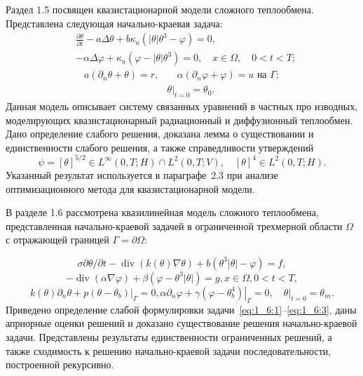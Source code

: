 Раздел 1.5 посвящен квазистационарной модели сложного теплообмена.
Представлена следующая начально-краевая задача:
\begin{equation}
    \label{eq:1_5:1}
    \begin{split}
        & \frac{\partial \theta}{\partial t} - a \Delta \theta
        + b \kappa_{a} \left(|\theta| \theta^{3}-\varphi\right) = 0,\\
        & - \alpha \Delta \varphi
        + \kappa_{a} \left(\varphi-|\theta| \theta^{3}\right) = 0,
        \quad x \in \Omega, \quad 0 < t < T;
    \end{split}
\end{equation}
\begin{align}
    a \left(\partial_{n} \theta+\theta\right)=r,
    & \quad \alpha\left(\partial_{n} \varphi
    + \varphi\right) = u \text { на } \Gamma;  \label{eq:1_5:2}\\
    & \left.\theta\right|_{t=0} = \theta_{0}. \label{eq:1_5:3}
\end{align}
Данная модель описывает систему связанных уравнений в частных про
изводных, моделирующих квазистационарный радиационный и диффузионный
теплообмен.
Дано определение слабого решения, доказана лемма о существовании и единственности
слабого решения, а также справедливости утверждений
\[
    \psi=[\theta]^{5 / 2} \in L^{\infty}(0, T ; H) \cap L^{2}(0, T ; V),
    \quad[\theta]^{4} \in L^{2}(0, T ; H).
\]
Указанный результат используется в параграфе~2.3 при анализе
оптимизационного метода для квазистационарной модели.

В разделе 1.6 рассмотрена квазилинейная модель сложного теплообмена,
представленная начально-краевой задачей в ограниченной трехмерной
области $\Omega$ с отражающей границей $\Gamma=\partial \Omega$:

\begin{equation}
    \label{eq:1_6:1}
    \sigma \partial \theta / \partial t
    -\operatorname{div}(k(\theta) \nabla \theta)
    +b\left(\theta^{3}|\theta|-\varphi\right)=f,
\end{equation}
\begin{equation}
    \label{eq:1_6:2}
    -\operatorname{div}(\alpha \nabla \varphi)
    +\beta\left(\varphi-\theta^{3}|\theta|\right)=g, x \in \Omega, 0<t<T,
\end{equation}
\begin{equation}
    \label{eq:1_6:3}
    k(\theta) \partial_{n} \theta+\left.p\left(\theta-\theta_{b}\right)\right|_{\Gamma}=0,
    \alpha \partial_{n} \varphi
    +\left.\gamma\left(\varphi-\theta_{b}^{4}\right)\right|_{\Gamma}=0,
    \left.\quad \theta\right|_{t=0}=\theta_{in}.
\end{equation}
Приведено определение слабой формулировки задачи~\eqref{eq:1_6:1}--\eqref{eq:1_6:3},
даны априорные оценки решений и доказано существование решения начально-краевой задачи.
Представлены результаты единственности ограниченных решений,
а также сходимость к решению начально-краевой задачи
последовательности, построенной рекурсивно.


